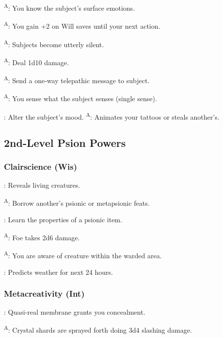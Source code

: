 \textsuperscript{A}: You know the subject's surface emotions.

\textsuperscript{A}: You gain +2 on Will saves until your next action.

\textsuperscript{A}: Subjects become utterly silent.

\textsuperscript{A}: Deal 1d10 damage.

\textsuperscript{A}: Send a one-way telepathic message to subject.

\textsuperscript{A}: You sense what the subject senses (single sense).

: Alter the subject's mood.
% 
\textsuperscript{A}: Animates your tattoos or steals another's.



\subsection{2nd-Level Psion Powers}


\subsubsection{Clairscience (Wis)}

: Reveals living creatures.

\textsuperscript{A}: Borrow another's psionic or metapsionic feats.

: Learn the properties of a psionic item.

\textsuperscript{A}: Foe takes 2d6 damage.

\textsuperscript{A}: You are aware of creature within the warded area.

: Predicts weather for next 24 hours.


\subsubsection{Metacreativity (Int)}

: Quasi-real membrane grants you concealment.

\textsuperscript{A}: Crystal shards are sprayed forth doing 3d4 slashing damage.


